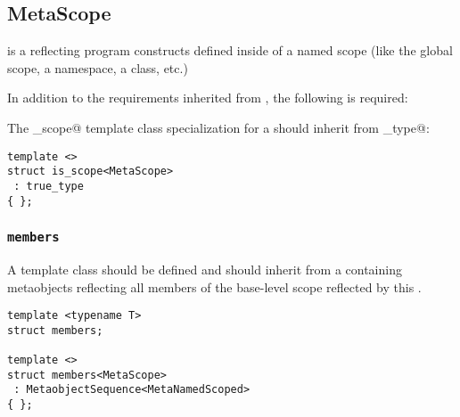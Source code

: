 \subsection{MetaScope}
\label{concept-MetaScope}


 is a  reflecting program constructs defined inside
of a named scope (like the global scope, a namespace, a class, etc.)

In addition to the requirements inherited from , the following is required:

The \verb@is_scope@ template class specialization for a  should
inherit from \verb@true_type@:

\begin{lstlisting}
template <>
struct is_scope<MetaScope>
 : true_type
{ };
\end{lstlisting}

\subsubsection{\texttt{members}}

A template class \verb@members@ should be defined and should inherit from a
 containing  metaobjects reflecting
all members of the base-level scope reflected by this .

\begin{lstlisting}
template <typename T>
struct members;

template <>
struct members<MetaScope>
 : MetaobjectSequence<MetaNamedScoped>
{ };
\end{lstlisting}

